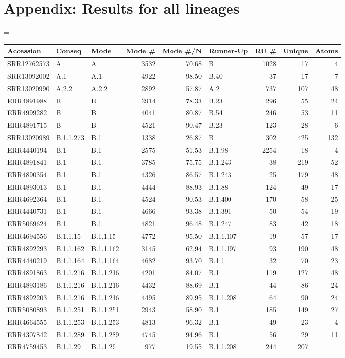 \documentclass[
]{article}
\begin{document}
\hypertarget{appendix-results-for-all-lineages}{%
\section{Appendix: Results for all
lineages}\label{appendix-results-for-all-lineages}}

\LTcapwidth=\textwidth

\scriptsize

\begin{longtable}[]{@{}lllrrlrrr@{}}
\toprule
Accession & Conseq & Mode & Mode \# & Mode \#/N & Runner-Up & RU \# &
Unique & Atoms\tabularnewline
\midrule
\endhead
SRR12762573 & A & A & 3532 & 70.68 & B & 1028 & 17 & 4\tabularnewline
SRR13092002 & A.1 & A.1 & 4922 & 98.50 & B.40 & 37 & 17 &
7\tabularnewline
SRR13020990 & A.2.2 & A.2.2 & 2892 & 57.87 & A.2 & 737 & 107 &
48\tabularnewline
ERR4891988 & B & B & 3914 & 78.33 & B.23 & 296 & 55 & 24\tabularnewline
ERR4999282 & B & B & 4041 & 80.87 & B.54 & 246 & 53 & 11\tabularnewline
ERR4891715 & B & B & 4521 & 90.47 & B.23 & 123 & 28 & 6\tabularnewline
SRR13020989 & B.1.1.273 & B.1 & 1338 & 26.87 & B & 302 & 425 &
132\tabularnewline
ERR4440194 & B.1 & B.1 & 2575 & 51.53 & B.1.98 & 2254 & 18 &
4\tabularnewline
ERR4891841 & B.1 & B.1 & 3785 & 75.75 & B.1.243 & 38 & 219 &
52\tabularnewline
ERR4890354 & B.1 & B.1 & 4326 & 86.57 & B.1.243 & 25 & 179 &
48\tabularnewline
ERR4893013 & B.1 & B.1 & 4444 & 88.93 & B.1.88 & 124 & 49 &
17\tabularnewline
ERR4692364 & B.1 & B.1 & 4524 & 90.53 & B.1.400 & 170 & 58 &
25\tabularnewline
ERR4440731 & B.1 & B.1 & 4666 & 93.38 & B.1.391 & 50 & 54 &
19\tabularnewline
ERR5069624 & B.1 & B.1 & 4821 & 96.48 & B.1.247 & 83 & 42 &
18\tabularnewline
ERR4694556 & B.1.1.15 & B.1.1.15 & 4772 & 95.50 & B.1.1.107 & 19 & 57 &
17\tabularnewline
ERR4892293 & B.1.1.162 & B.1.1.162 & 3145 & 62.94 & B.1.1.197 & 93 & 190
& 48\tabularnewline
ERR4440219 & B.1.1.164 & B.1.1.164 & 4682 & 93.70 & B.1.1 & 32 & 70 &
23\tabularnewline
ERR4891863 & B.1.1.216 & B.1.1.216 & 4201 & 84.07 & B.1 & 119 & 127 &
48\tabularnewline
ERR4893186 & B.1.1.216 & B.1.1.216 & 4432 & 88.69 & B.1 & 44 & 86 &
24\tabularnewline
ERR4892203 & B.1.1.216 & B.1.1.216 & 4495 & 89.95 & B.1.1.208 & 64 & 90
& 24\tabularnewline
ERR5080893 & B.1.1.251 & B.1.1.251 & 2943 & 58.90 & B.1 & 185 & 149 &
27\tabularnewline
ERR4664555 & B.1.1.253 & B.1.1.253 & 4813 & 96.32 & B.1 & 49 & 23 &
4\tabularnewline
ERR4307842 & B.1.1.289 & B.1.1.289 & 4745 & 94.96 & B.1 & 56 & 29 &
11\tabularnewline
ERR4759453 & B.1.1.29 & B.1.1.29 & 977 & 19.55 & B.1.1.208 & 244 & 207 &

\end{longtable}
\end{document}
